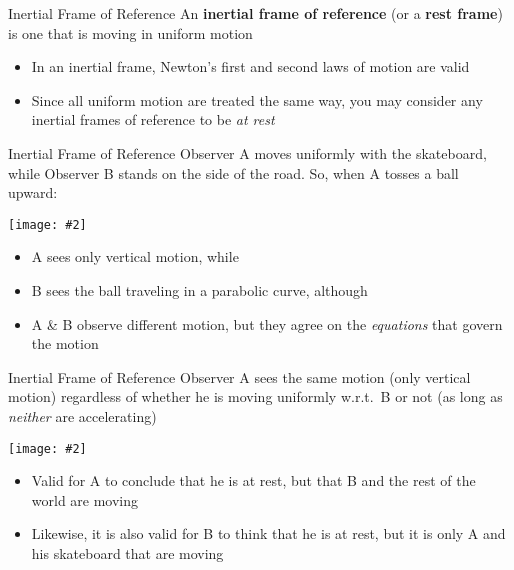\documentclass[12pt,compress,aspectratio=169]{beamer}
\newcommand{\pic}[2]{\texttt{[image: \#2]}}
\begin{document}
\begin{frame}{Inertial Frame of Reference}
  An \textbf{inertial frame of reference} (or a \textbf{rest frame}) is one
  that is moving in uniform motion
  \begin{itemize}
  \item In an inertial frame, Newton's first and second laws of motion are valid
  \item Since all uniform motion are treated the same way, you may consider
    any inertial frames of reference to be \emph{at rest}
  \end{itemize}
  \vspace{.2in}
  \begin{center}
  \end{center}
\end{frame}



\begin{frame}{Inertial Frame of Reference}
  Observer A moves uniformly with the skateboard, while Observer B stands on
  the side of the road. So, when A tosses a ball upward:
  \begin{center}
    \pic{.55}{graphics/57}
  \end{center}
  \begin{itemize}
  \item A sees only vertical motion, while
  \item B sees the ball traveling in a parabolic curve, although
  \item A \& B observe different motion, but they agree on the \emph{equations}
    that govern the motion
  \end{itemize}
\end{frame}



\begin{frame}{Inertial Frame of Reference}
  Observer A sees the same motion (only vertical motion) regardless of whether
  he is moving uniformly w.r.t.\ B or not (as long as \emph{neither} are
  accelerating)
  \begin{center}
    \pic{.55}{graphics/57.png}
  \end{center}
  \begin{itemize}
  \item Valid for A to conclude that he is at rest, but that B and the rest of
    the world are moving
  \item Likewise, it is also valid for B to think that he is at rest, but it is
    only A and his skateboard that are moving
  \end{itemize}
\end{frame}
    
\end{document}
